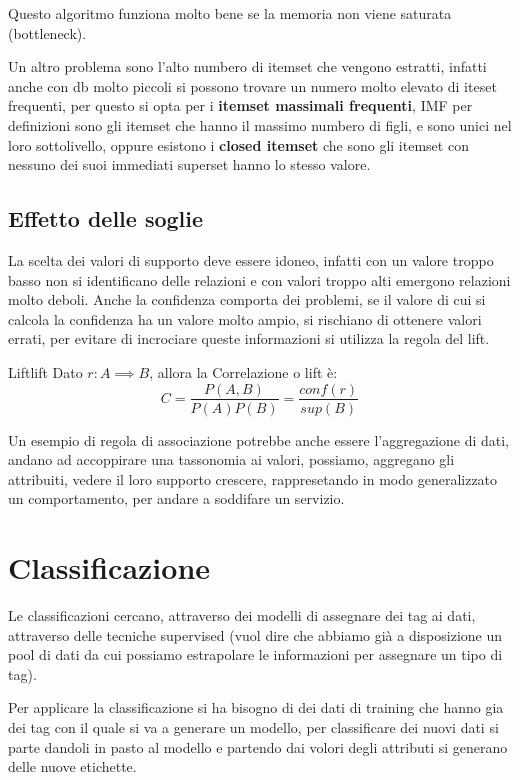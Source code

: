 \documentclass[12pt]{article}
\begin{document}
Questo algoritmo funziona molto bene se la memoria non viene saturata (bottleneck).

Un altro problema sono l'alto numbero di itemset che vengono estratti, infatti anche con db molto piccoli si possono trovare un numero molto elevato di iteset frequenti, per questo si opta per i \textbf{itemset massimali frequenti}, IMF per definizioni sono gli itemset che hanno il massimo numbero di figli, e sono unici nel loro sottolivello, oppure esistono i \textbf{closed itemset} che sono gli itemset con nessuno dei suoi immediati superset hanno lo stesso valore.

\subsection{Effetto delle soglie}
La scelta dei valori di supporto deve essere idoneo, infatti con un valore troppo basso non si identificano delle relazioni e con valori troppo alti emergono relazioni molto deboli. Anche la confidenza comporta dei problemi, se il valore di cui si calcola la confidenza ha un valore molto ampio, si rischiano di ottenere valori errati, per evitare di incrociare queste informazioni si utilizza la regola del lift.
\begin{definition}{Lift}{lift}
    Dato $ r: A \implies B $, allora la Correlazione o lift \`e:
    \[ C = \frac{P(A,B)}{P(A)P(B)} = \frac{conf(r)}{sup(B)} \]
\end{definition}


Un esempio di regola di associazione potrebbe anche essere l'aggregazione di dati, andano ad accoppirare una tassonomia ai valori, possiamo, aggregano gli attribuiti, vedere il loro supporto crescere, rappresetando in modo generalizzato un comportamento, per andare a soddifare un servizio.


\newpage
\section{Classificazione}
Le classificazioni cercano, attraverso dei modelli di assegnare dei tag ai dati, attraverso delle tecniche supervised (vuol dire che abbiamo gi\`a a disposizione un pool di dati da cui possiamo estrapolare le informazioni per assegnare un tipo di tag).

Per applicare la classificazione si ha bisogno di dei dati di training che hanno gia dei tag con il quale si va a generare un modello, per classificare dei nuovi dati si parte dandoli in pasto al modello e partendo dai volori degli attributi si generano delle nuove etichette.
\end{document}

